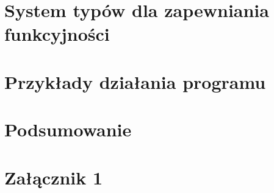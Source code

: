 \documentclass{pracamgr}
\begin{document}
\chapter{System typów dla zapewniania funkcyjności}
\label{type-system}

\chapter{Przykłady działania programu}
\label{verification-results}

\chapter{Podsumowanie}
\label{conclusion}

\appendix

\chapter{Załącznik 1} %

{}

\end{document}
